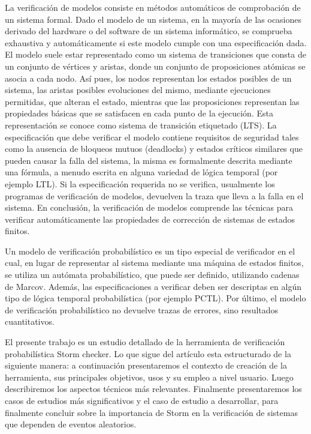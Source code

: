 \documentclass[11pt]{article}
\begin{document}
La verificaci\'on de modelos %
consiste en m\'etodos autom\'aticos de comprobaci\'on de un sistema formal. Dado el modelo de un sistema, en la mayor\'ia de las ocasiones derivado del hardware o del software de un sistema inform\'atico, se comprueba exhaustiva y autom\'aticamente si este modelo cumple con una especificaci\'on dada. El modelo suele estar representado como un sistema de transiciones %
que consta de un conjunto de v\'ertices y aristas, donde un conjunto de proposiciones at\'omicas se asocia a cada nodo. As\'i pues, los nodos representan los estados posibles de un sistema, las aristas posibles evoluciones del mismo, mediante ejecuciones permitidas, que alteran el estado, mientras que las proposiciones representan las propiedades b\'asicas que se satisfacen en cada punto de la ejecuci\'on. Esta representaci\'on se conoce como sistema de transici\'on etiquetado (LTS). La especificaci\'on que debe verificar el modelo contiene requisitos de seguridad tales como la ausencia de bloqueos mutuos (deadlocks) y estados cr\'iticos similares que pueden causar la falla del sistema, la misma es formalmente descrita mediante una f\'ormula, a menudo escrita en alguna variedad de l\'ogica temporal (por ejemplo LTL). Si la especificaci\'on requerida no se verifica, usualmente los programas de verificaci\'on de modelos, devuelven la traza que lleva a la falla en el sistema. En conclusi\'on, la verificaci\'on de modelos comprende las t\'ecnicas para verificar autom\'aticamente las propiedades de correcci\'on de sistemas de estados finitos.

Un modelo de verificaci\'on probabil\'istico es un tipo especial de verificador en el cual, en lugar de representar al sistema mediante una m\'aquina de estados finitos, se utiliza un aut\'omata probabil\'istico, que puede ser definido, utilizando cadenas de Marcov. Adem\'as, las especificaciones a verificar deben ser descriptas en alg\'un tipo de l\'ogica temporal probabil\'istica (por ejemplo PCTL). Por \'ultimo, el modelo de verificaci\'on probabil\'istico no devuelve trazas de errores, sino resultados cuantitativos.

El presente trabajo es un estudio detallado de la herramienta de verificaci\'on probabil\'istica Storm checker. Lo que sigue del art\'iculo esta estructurado de la siguiente manera: a continuaci\'on presentaremos el contexto de creaci\'on de la herramienta, sus principales objetivos, usos y su empleo a nivel usuario. Luego describiremos los aspectos t\'ecnicos m\'as relevantes. %
Finalmente presentaremos los casos de estudios m\'as significativos y el caso de estudio a desarrollar, para finalmente concluir sobre la importancia de Storm en la verificaci\'on de sistemas que dependen de eventos aleatorios. 
\end{document}
